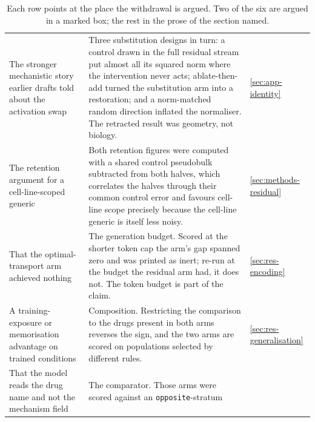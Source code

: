 \begin{table}[htbp]
\caption[The six corrections this thesis records against itself]{ Each row points at the
place the withdrawal is argued. Two of the six are argued in a marked box;
the rest in the prose of the section named.}
\label{tab:corrections}
\begin{fullwidth}
\begin{threeparttable}
\begin{tabularx}{\linewidth}{@{}L{46mm} Y l@{}}
 &  &  \\
\midrule
The stronger mechanistic story earlier drafts told about the activation swap
  & Three substitution designs in turn: a control drawn in the full residual
    stream put almost all its squared norm where the intervention never acts;
    ablate-then-add turned the substitution arm into a restoration; and a
    norm-matched random direction inflated the normaliser. The retracted result
    was geometry, not biology.
  & \cref{sec:app-identity} \\
\addlinespace[10pt]
The retention argument for a cell-line-scoped generic
  & Both retention figures were computed with a shared control pseudobulk
    subtracted from both halves, which correlates the halves through their
    common control error and favours cell-line scope precisely because the
    cell-line generic is itself less noisy.
  & \cref{sec:methods-residual} \\
\addlinespace[10pt]
That the optimal-transport arm achieved nothing
  & The generation budget. Scored at the shorter token cap the arm's gap spanned
    zero and was printed as inert; re-run at the budget the residual arm had, it
    does not. The token budget is part of the claim.
  & \cref{sec:res-encoding} \\
\addlinespace[10pt]
A training-exposure or memorisation advantage on trained conditions
  & Composition. Restricting the comparison to the drugs present in both arms
    reverses the sign, and the two arms are scored on populations selected by
    different rules.
  & \cref{sec:res-generalisation} \\
\addlinespace[10pt]
That the model reads the drug name and not the mechanism field
  & The comparator. Those arms were scored against an \texttt{opposite}-stratum

\end{tabularx}
\end{threeparttable}
\end{fullwidth}
\end{table}
